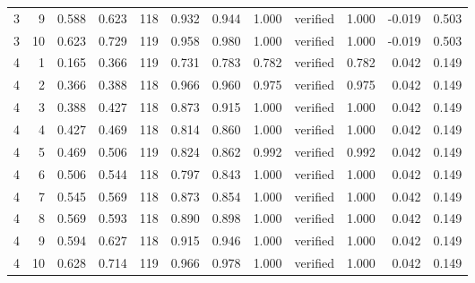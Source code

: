\begin{tabular}{rrrrrrrrlrrr}
3 & 9 & 0.588 & 0.623 & 118 & 0.932 & 0.944 & 1.000 & verified & 1.000 & -0.019 & 0.503 \\
3 & 10 & 0.623 & 0.729 & 119 & 0.958 & 0.980 & 1.000 & verified & 1.000 & -0.019 & 0.503 \\
4 & 1 & 0.165 & 0.366 & 119 & 0.731 & 0.783 & 0.782 & verified & 0.782 & 0.042 & 0.149 \\
4 & 2 & 0.366 & 0.388 & 118 & 0.966 & 0.960 & 0.975 & verified & 0.975 & 0.042 & 0.149 \\
4 & 3 & 0.388 & 0.427 & 118 & 0.873 & 0.915 & 1.000 & verified & 1.000 & 0.042 & 0.149 \\
4 & 4 & 0.427 & 0.469 & 118 & 0.814 & 0.860 & 1.000 & verified & 1.000 & 0.042 & 0.149 \\
4 & 5 & 0.469 & 0.506 & 119 & 0.824 & 0.862 & 0.992 & verified & 0.992 & 0.042 & 0.149 \\
4 & 6 & 0.506 & 0.544 & 118 & 0.797 & 0.843 & 1.000 & verified & 1.000 & 0.042 & 0.149 \\
4 & 7 & 0.545 & 0.569 & 118 & 0.873 & 0.854 & 1.000 & verified & 1.000 & 0.042 & 0.149 \\
4 & 8 & 0.569 & 0.593 & 118 & 0.890 & 0.898 & 1.000 & verified & 1.000 & 0.042 & 0.149 \\
4 & 9 & 0.594 & 0.627 & 118 & 0.915 & 0.946 & 1.000 & verified & 1.000 & 0.042 & 0.149 \\
4 & 10 & 0.628 & 0.714 & 119 & 0.966 & 0.978 & 1.000 & verified & 1.000 & 0.042 & 0.149 \\
\bottomrule
\end{tabular}
